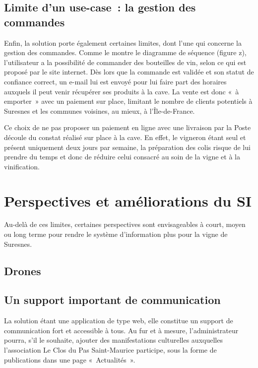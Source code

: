 \documentclass[a4paper, titlepage]{report}
\begin{document}
\subsection{Limite d'un use-case~: la gestion des commandes}\label{limite-dun-use-case-la-gestion-des-commandes}

Enfin, la solution porte également certaines limites, dont l'une qui
concerne la gestion des commandes. Comme le montre le diagramme de
séquence (figure z), l'utilisateur a la possibilité de commander des
bouteilles de vin, selon ce qui est proposé par le site internet. Dès
lors que la commande est validée et son statut de confiance correct, un
e-mail lui est envoyé pour lui faire part des horaires auxquels il peut
venir récupérer ses produits à la cave. La vente est donc «~à emporter~»
avec un paiement sur place, limitant le nombre de clients potentiels à
Suresnes et les communes voisines, au mieux, à l'Île-de-France.

Ce choix de ne pas proposer un paiement en ligne avec une livraison par
la Poste découle du constat réalisé sur place à la cave. En effet, le
vigneron étant seul et présent uniquement deux jours par semaine, la
préparation des colis risque de lui prendre du temps et donc de réduire
celui consacré au soin de la vigne et à la vinification.

\section{Perspectives et améliorations du SI}\label{perspectives-et-amuxe9liorations-du-si}

Au-delà de ces limites, certaines perspectives sont envisageables à
court, moyen ou long terme pour rendre le système d'information plus
pour la vigne de Suresnes.

\subsection{Drones}\label{drones}

\subsection{Un support important de communication}\label{un-support-important-de-communication}

La solution étant une application de type web, elle constitue un support
de communication fort et accessible à tous. Au fur et à mesure,
l'administrateur pourra, s'il le souhaite, ajouter des manifestations
culturelles auxquelles l'association Le Clos du Pas Saint-Maurice
participe, sous la forme de publications dans une page «~Actualités~».
\end{document}

